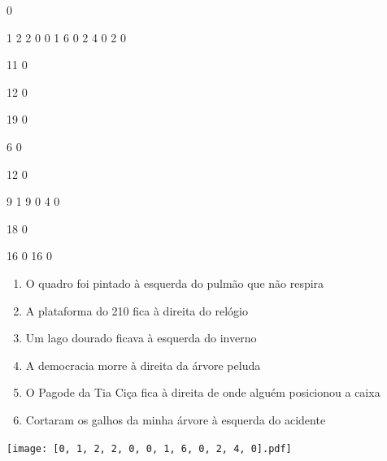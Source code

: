 \documentclass[12pt]{article}
\begin{document}
		\vfill  
		  
{
	0	%

	1	%
	2	%
	2	%
	0	%
	0	%
	1	%
	6	%
	0	%
	2	%
	4	%
	0	%
	2	%
	0	%

	11	%
	0	%

	12	%
	0	%

	19	%
	0	%

	6	%
	0	%

	12	%
	0	%

	9	%
	1	%
	9	%
	0	%
	4	%
	0	%

	18	%
	0	%

	16	%
	0	%
	16	%
	0	%

}	  
		    	

		 

\pagebreak


	\begin{enumerate}
		  \sffamily %
		  \large %


\vfill \item
O quadro foi pintado	%
à esquerda
do pulmão que não respira	%

\vfill \item
A plataforma do 210 fica	%
à direita
do relógio	%

\vfill \item
Um lago dourado ficava	%
à esquerda
do inverno	%

\vfill \item
A democracia morre	%
à direita
da árvore peluda	%

\vfill \item
O Pagode da Tia Ciça fica	%
à direita
de onde alguém posicionou a caixa	%

\vfill \item
Cortaram os galhos da minha árvore	%
à esquerda
do acidente	%
	\end{enumerate}
		  
		  \hfill

		  \vfill

\texttt{[image: [0, 1, 2, 2, 0, 0, 1, 6, 0, 2, 4, 0].pdf]}


	\hfill	  	  
\end{document}
